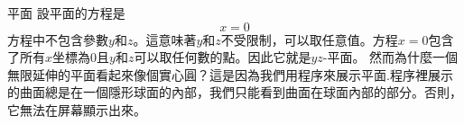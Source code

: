 \begin{surferPage}{平面}
設平面的方程是\[x=0\]方程中不包含參數$y$和$z$。這意味著$y$和$z$不受限制，可以取任意值。方程$x=0$包含了所有$x$坐標為$0$且$y$和$z$可以取任何數的點。因此它就是$yz$-平面。
\newline \newline
然而為什麼一個無限延伸的平面看起來像個實心圓？這是因為我們用程序來展示平面.程序裡展示的曲面總是在一個隱形球面的內部，我們只能看到曲面在球面內部的部分。否則，它無法在屏幕顯示出來。
\end{surferPage}
